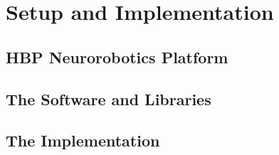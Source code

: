 
\chapter{Setup and Implementation}\label{chapter:Setup and Implementation}


\section{HBP Neurorobotics Platform}

\section{The Software and Libraries}

\section{The Implementation}